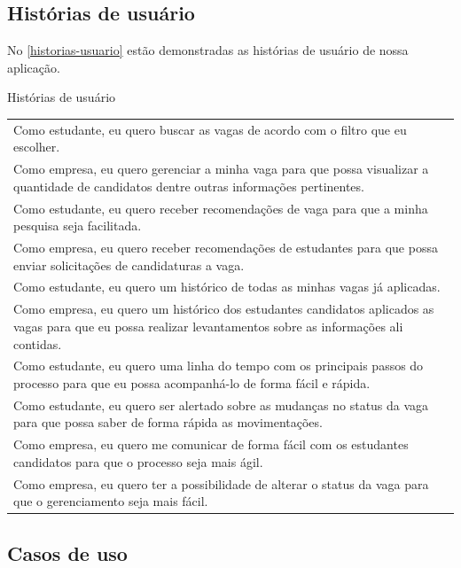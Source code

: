 \subsection{Histórias de usuário}

No \autoref{historias-usuario} estão demonstradas as histórias de usuário de nossa aplicação.

\begin{quadro}[H]
	\centering
	\ABNTEXfontereduzida
	\caption{Histórias de usuário}
	\label{historias-usuario}
	\begin{tabular}{ | p{15.0cm} | }
	\hline
	\thead{História} \\
	\hline
	 Como estudante, eu quero buscar as vagas de acordo com o filtro que eu escolher. \\
	 \hline
	 Como empresa, eu quero gerenciar a minha vaga para que possa visualizar a quantidade de candidatos dentre outras informações pertinentes. \\
	 \hline
	 Como estudante, eu quero receber recomendações de vaga para que a minha pesquisa seja facilitada. \\
	 \hline
	 Como empresa, eu quero receber recomendações de estudantes para que possa enviar solicitações de candidaturas a vaga. \\
	 \hline
	 Como estudante, eu quero um histórico de todas as minhas vagas já aplicadas. \\
	 \hline
	 Como empresa, eu quero um histórico dos estudantes candidatos aplicados as vagas para que eu possa realizar levantamentos sobre as informações ali contidas. \\
	 \hline
	 Como estudante, eu quero uma linha do tempo com os principais passos do processo para que eu possa acompanhá-lo de forma fácil e rápida. \\
	 \hline
	 Como estudante, eu quero ser alertado sobre as mudanças no status da vaga para que possa saber de forma rápida as movimentações. \\
	 \hline
	 Como empresa, eu quero me comunicar de forma fácil com os estudantes candidatos para que o processo seja mais ágil. \\
	 \hline
	 Como empresa, eu quero ter a possibilidade de alterar o status da vaga para que o gerenciamento seja mais fácil. \\
	 \hline
	\end{tabular}
\end{quadro}

\subsection{Casos de uso}

